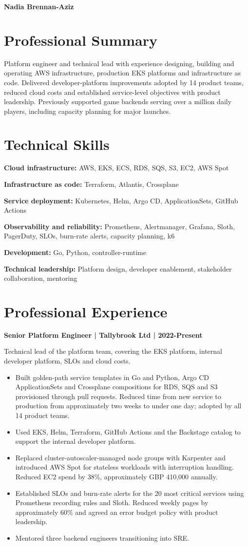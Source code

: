 \documentclass[11pt,a4paper]{article}
\newcommand{\cvheader}[2]{{\LARGE\bfseries\color{primarycolor} #1}\par\vspace{0.25em}{\large\color{accentcolor} #2}\par}
\newcommand{\cvsection}[1]{\section*{#1}}
\begin{document}
\cvheader{Nadia Brennan-Aziz}{Senior Platform Engineer}

\cvsection{Professional Summary}
Platform engineer and technical lead with experience designing, building and operating AWS infrastructure, production EKS platforms and infrastructure as code. Delivered developer-platform improvements adopted by 14 product teams, reduced cloud costs and established service-level objectives with product leadership. Previously supported game backends serving over a million daily players, including capacity planning for major launches.

\cvsection{Technical Skills}
\textbf{Cloud infrastructure:} AWS, EKS, ECS, RDS, SQS, S3, EC2, AWS Spot\par
\textbf{Infrastructure as code:} Terraform, Atlantis, Crossplane\par
\textbf{Service deployment:} Kubernetes, Helm, Argo CD, ApplicationSets, GitHub Actions\par
\textbf{Observability and reliability:} Prometheus, Alertmanager, Grafana, Sloth, PagerDuty, SLOs, burn-rate alerts, capacity planning, k6\par
\textbf{Development:} Go, Python, controller-runtime\par
\textbf{Technical leadership:} Platform design, developer enablement, stakeholder collaboration, mentoring

\cvsection{Professional Experience}
\textbf{Senior Platform Engineer | Tallybrook Ltd | 2022-Present}\par
Technical lead of the platform team, covering the EKS platform, internal developer platform, SLOs and cloud costs.
\begin{itemize}
\item Built golden-path service templates in Go and Python, Argo CD ApplicationSets and Crossplane compositions for RDS, SQS and S3 provisioned through pull requests. Reduced time from new service to production from approximately two weeks to under one day; adopted by all 14 product teams.
\item Used EKS, Helm, Terraform, GitHub Actions and the Backstage catalog to support the internal developer platform.
\item Replaced cluster-autoscaler-managed node groups with Karpenter and introduced AWS Spot for stateless workloads with interruption handling. Reduced EC2 spend by 38\%, approximately GBP 410,000 annually.
\item Established SLOs and burn-rate alerts for the 20 most critical services using Prometheus recording rules and Sloth. Reduced weekly pages by approximately 60\% and agreed an error budget policy with product leadership.
\item Mentored three backend engineers transitioning into SRE.
\end{itemize}
\end{document}
